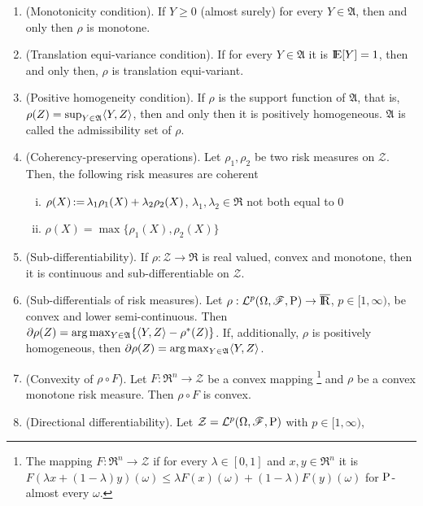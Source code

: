 \documentclass[a4paper,10pt]{scrbook}
\begin{document}
\begin{enumerate}
 \item (Monotonicity condition). If $Y\geq 0$ (almost surely) for every $Y\in \mathfrak{A}$, 
       then and only then $\rho$ is monotone.
       
 \item (Translation equi-variance condition). If for every $Y\in\mathfrak{A}$ it is $\E[Y]=1$,
       then and only then, $\rho$ is translation equi-variant.
       
 \item (Positive homogeneity condition). If $\rho$ is the support function of $\mathfrak{A}$, 
       that is, $\rho(Z) = \sup_{Y\in\mathfrak{A}}\langle Y,Z\rangle$, then and only then it is positively homogeneous.
       $\mathfrak{A}$ is called the admissibility set of $\rho$.
       
 \item (Coherency-preserving operations). Let $\rho_1,\rho_2$ be two risk measures on $\mathcal{Z}$.
       Then, the following risk measures are coherent
       \begin{enumerate}[i.]
        \item $\rho(X) {}\mathop{\mathrel{:}=}{} \lambda_1\rho_1(X)+\lambda_2\rho_2(X)$, $\lambda_1,\lambda_2\in\Re$ not both equal to $0$
        \item $\rho(X) = \max\{\rho_1(X), \rho_2(X)\}$
       \end{enumerate}       
 \item (Sub-differentiability). If $\rho:\mathcal{Z}\to\Re$ is real valued, convex and monotone, 
       then it is continuous and sub-differentiable on $\mathcal{Z}$.
 \item (Sub-differentials of risk measures). Let $\rho:\mathcal{L}^p\ofp \to \barre$, $p\in [1,\infty)$,
        be convex and lower semi-continuous. Then $\partial \rho(Z) = \arg\max_{Y\in\mathfrak{A}} \{\langle Y,Z\rangle - \rho^*(Z)\}$.
        If, additionally, $\rho$ is positively homogeneous, then $\partial \rho(Z) = \arg\max_{Y\in\mathfrak{A}}\langle Y,Z\rangle$.
 \item (Convexity of $\rho\circ F$). Let $F:\Re^n\to\mathcal{Z}$ be a convex mapping%
       \footnote{The mapping $F:\Re^n\to\mathcal{Z}$ if for every $\lambda\in[0,1]$ and $x,y\in\Re^n$
                 it is $F(\lambda x + (1-\lambda)y)(\omega) \leq \lambda F(x)(\omega) + (1-\lambda)F(y)(\omega)$
                 for $\mathrm{P}$-almost every $\omega$.} and $\rho$ be a convex
       monotone risk measure. Then $\rho\circ F$ is convex. 
 \item (Directional differentiability). Let $\mathcal{Z}=\mathcal{L}^p(\Omega,\mathscr{F},\mathrm{P})$ with $p\in[1,\infty)$,

\end{enumerate}
\end{document}
